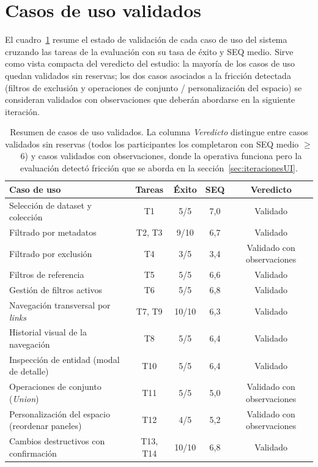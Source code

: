 \section{Casos de uso validados}
\label{sec:casosDeUsoValidados}

El cuadro~\ref{tab:casosDeUsoValidados} resume el estado de validación de cada caso de uso
del sistema cruzando las tareas de la evaluación con su tasa de éxito y SEQ medio. Sirve
como vista compacta del veredicto del estudio: la mayoría de los casos de uso quedan
validados sin reservas; los dos casos asociados a la fricción detectada (filtros de
exclusión y operaciones de conjunto / personalización del espacio) se consideran validados
con observaciones que deberán abordarse en la siguiente iteración.

\begin{table}[H]
\centering
\small
\begin{tabularx}{\textwidth}{X c c c c}
\hline
\textbf{Caso de uso}                                  & \textbf{Tareas}   & \textbf{Éxito} & \textbf{SEQ} & \textbf{Veredicto} \\
\hline
Selección de dataset y colección                      & T1                & 5/5 & 7{,}0 & Validado \\
Filtrado por metadatos                                & T2, T3            & 9/10 & 6{,}7 & Validado \\
Filtrado por exclusión                                & T4                & 3/5 & 3{,}4 & Validado con observaciones \\
Filtros de referencia                                 & T5                & 5/5 & 6{,}6 & Validado \\
Gestión de filtros activos                            & T6                & 5/5 & 6{,}8 & Validado \\
Navegación transversal por \textit{links}             & T7, T9            & 10/10 & 6{,}3 & Validado \\
Historial visual de la navegación                     & T8                & 5/5 & 6{,}4 & Validado \\
Inspección de entidad (modal de detalle)              & T10               & 5/5 & 6{,}4 & Validado \\
Operaciones de conjunto (\textit{Union})              & T11               & 5/5 & 5{,}0 & Validado con observaciones \\
Personalización del espacio (reordenar paneles)       & T12               & 4/5 & 5{,}2 & Validado con observaciones \\
Cambios destructivos con confirmación                 & T13, T14          & 10/10 & 6{,}8 & Validado \\
\hline
\end{tabularx}
\caption[Resumen de casos de uso validados]{Resumen de casos de uso validados. La columna \textit{Veredicto} distingue entre
casos validados sin reservas (todos los participantes los completaron con SEQ medio
$\geq$~6) y casos validados con observaciones, donde la operativa funciona pero la
evaluación detectó fricción que se aborda en la sección~\ref{sec:iteracionesUI}.}
\label{tab:casosDeUsoValidados}
\end{table}


